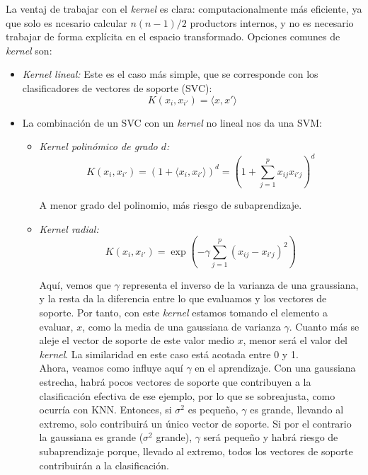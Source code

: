 La ventaj de trabajar con el \textit{kernel} es clara: computacionalmente más eficiente, ya que solo es ncesario calcular $n(n-1)/2$ productors internos, y no es necesario trabajar de forma explícita en el espacio transformado. Opciones comunes de \textit{kernel} son:
\begin{itemize}
\item \textit{Kernel lineal:} Este es el caso más simple, que se corresponde con los clasificadores de vectores de soporte (SVC):
\begin{equation}
K(x_i, x_{i'}) = \langle x, x' \rangle
\end{equation}
\item La combinación de un SVC con un \textit{kernel} no lineal nos da una SVM: 
\begin{itemize}
\item \textit{Kernel polinómico de grado $d$:} 
\begin{equation}
K(x_i, x_{i'}) = (1 + \langle x_i, x_{i'} \rangle)^d = \left(1 + \sum_{j = 1}^p x_{ij} x_{i'j}\right)^d
\end{equation}

A menor grado del polinomio, más riesgo de subaprendizaje.
\item \textit{Kernel radial:}
\begin{equation}
K(x_i, x_{i'}) = \exp \left( - \gamma \sum_{j = 1}^p (x_{ij} - x_{i'j})^2 \right)
\end{equation}

Aquí, vemos que $\gamma$ representa el inverso de la varianza de una graussiana, y la resta da la diferencia entre lo que evaluamos y los vectores de soporte. Por tanto, con este \textit{kernel} estamos tomando el elemento a evaluar, $x$, como la media de una gaussiana de varianza $\gamma$. Cuanto más se aleje el vector de soporte de este valor medio $x$, menor será el valor del \textit{kernel}. La similaridad en este caso está acotada entre 0 y 1. \\

Ahora, veamos como influye aquí $\gamma$ en el aprendizaje. Con una gaussiana estrecha, habrá pocos vectores de soporte que contribuyen a la clasificación efectiva de ese ejemplo, por lo que se sobreajusta, como ocurría con KNN. Entonces, si $\sigma^2$ es pequeño, $\gamma$ es grande, llevando al extremo, solo contribuirá un único vector de soporte. Si por el contrario la gaussiana es grande ($\sigma^2$ grande), $\gamma$ será pequeño y habrá riesgo de subaprendizaje porque, llevado al extremo, todos los vectores de soporte contribuirán a la clasificación.
\end{itemize}
\end{itemize}



